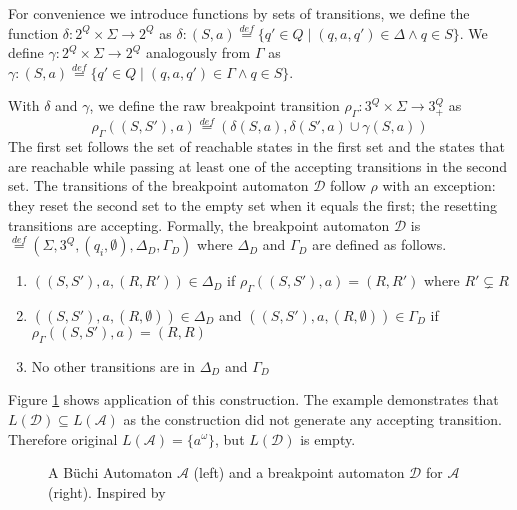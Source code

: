 \documentclass[
	digital,
nolof, nolot
]{fithesis3}
\newcommand{\cA}{\mathcal{A}}
\newcommand{\cD}{\mathcal{D}}
\newcommand{\lA}{L(\cA)}
\newcommand{\lD}{L(\cD)}
\newcommand{\eqdef}{\overset{def}{=}}
\begin{document}
			For convenience we introduce functions by sets of transitions, we define the function $\delta \colon 2^Q \times \Sigma \rightarrow 2^Q$ as 	
			$\delta\colon (S,a)\eqdef\{q'\in Q \mid  (q,a,q') \in \Delta \land q \in S\}$.
			We define $\gamma:2^Q  \times \Sigma \rightarrow 2^Q$ analogously from $\Gamma$ as $\gamma\colon (S,a)\eqdef\{q'\in Q \mid  (q,a,q') \in \Gamma \land q \in S\}$.
			
			
			With $\delta$ and $\gamma$, we define the raw breakpoint transition
			$\rho_\Gamma \colon 3^Q \times \Sigma \rightarrow 3^Q_+$ as
			\[\rho_\Gamma((S, S'), a) \eqdef(\delta(S, a), \delta(S',a)\cup \gamma(S, a))\]
			The first set follows the set of reachable states in the first set and the states that are reachable while passing at least one of the accepting transitions in the second set.
			The transitions of the breakpoint automaton $\cD$ follow $\rho$ with an exception: they reset the second set to the empty set when it equals the first; the resetting transitions are accepting.
			Formally, the breakpoint automaton $\cD$ is $ \eqdef (\Sigma, 3^Q, (q_i, \emptyset), \Delta_D, \Gamma_D)$ where $\Delta_D$ and $\Gamma_D$ are defined as follows. 
			
			\begin{enumerate}
				\item $((S, S'), a, (R, R')) \in \Delta_D$ if $\rho_\Gamma((S,S'),a)=(R,R')$ where $R' \subsetneq R$
				\item $((S, S'), a, (R, \emptyset)) \in \Delta_D$ and $((S, S'), a, (R, \emptyset)) \in \Gamma_D$ if $\rho_\Gamma((S,S'),a)=(R,R)$ 
				\item No other transitions are in $\Delta_D$ and $\Gamma_D$
			\end{enumerate}
			
			Figure \ref{fig:bp:non-equivalent} shows application of this construction. The example demonstrates that $\lD \subseteq \lA$ as the construction did not generate any accepting transition. Therefore original $\lA=\{a^\omega\}$, but $\lD$ is empty. 
			
			
			
			\begin{figure}[ht]
				\begin{center}
					
					
				\end{center}
				\caption{A Büchi Automaton $\cA$ (left) and a breakpoint automaton $\cD$ for $\cA$ (right). Inspired by \cite[Figure~7.3]{Blahoudek2018thesis}}
				\label{fig:bp:non-equivalent}
			\end{figure}
		
\end{document}
